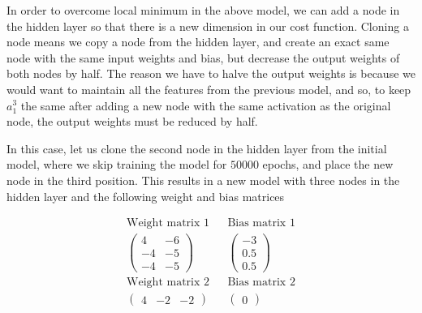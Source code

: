 \documentclass[12pt,english,]{article}
\newcommand{\mtx}[1]{\begin{pmatrix}#1\end{pmatrix}} %
\begin{document}
In order to overcome local minimum in the above model, we can add a node in the hidden layer so that there is a new dimension in our cost function.  Cloning a node means we copy a node from the hidden layer, and create an exact same node with the same input weights and bias, but decrease the output weights of both nodes by half. The reason we have to halve the output weights is because we would want to maintain all the features from the previous model, and so, to keep  $a_{1}^{3}$ the same after adding a new node with the same activation as the original node, the output weights must be reduced by half. 

In this case, let us clone the second node in the hidden layer from the initial model, where we skip training the model for $50000$ epochs, and place the new node in the third position. This results in a new model with three nodes in the hidden layer and the following weight and bias matrices


\begin{align*}
\text{Weight matrix 1} &&\text{Bias matrix 1}\\
\mtx{4 & -6\\  -4 & -5 \\ -4 & -5} &&\mtx{-3 \\ 0.5 \\ 0.5 }\\
\text{Weight matrix 2} &&\text{Bias matrix 2}\\
\mtx{4 & -2 &  -2} &&\mtx{0}\\
\end{align*}
\end{document}
